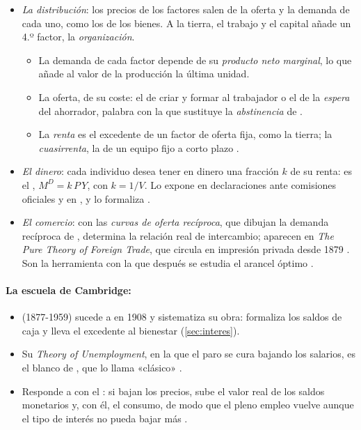 \documentclass[11pt]{article}
\begin{document}
\begin{itemize}
\item \emph{La distribución}: los precios de los factores salen de la oferta y la demanda de cada uno, como los de los bienes. A la tierra, el trabajo y el capital añade un 4.º factor, la \emph{organización}.
  \begin{itemize}
  \item La demanda de cada factor depende de su \emph{producto neto marginal}, lo que añade al valor de la producción la última unidad.
  \item La oferta, de su coste: el de criar y formar al trabajador o el de la \emph{espera} del ahorrador, palabra con la que sustituye la \emph{abstinencia} de .
  \item La \emph{renta} es el excedente de un factor de oferta fija, como la tierra; la \emph{cuasirrenta}, la de un equipo fijo a corto plazo .
  \end{itemize}
\item \emph{El dinero}: cada individuo desea tener en dinero una fracción $k$ de su renta: es el , $M^D=k\,P\,Y$, con $k=1/V$. Lo expone  en declaraciones ante comisiones oficiales y en \textcite{Marshall1923}, y lo formaliza \textcite{Pigou1917Value} .
\item \emph{El comercio}: con las \emph{curvas de oferta recíproca}, que dibujan la demanda recíproca de , determina la relación real de intercambio; aparecen en \emph{The Pure Theory of Foreign Trade}, que circula en impresión privada desde 1879\nocite{Marshall1879Pure} . Son la herramienta con la que después se estudia el arancel óptimo .
\end{itemize}

\paragraph{La escuela de Cambridge: }

\begin{itemize}
\item {} (1877-1959) sucede a  en 1908\nocite{HET2026Pigou} y sistematiza su obra: formaliza los saldos de caja\nocite{Pigou1917Value} y lleva el excedente al bienestar (\ref{sec:interes}).
\item Su \emph{Theory of Unemployment}\nocite{Pigou1933Theory}, en la que el paro se cura bajando los salarios, es el blanco de , que lo llama «clásico» .
\item Responde a  con el : si bajan los precios, sube el valor real de los saldos monetarios y, con él, el consumo, de modo que el pleno empleo vuelve aunque el tipo de interés no pueda bajar más\nocite{Pigou1943Classical} .
\end{itemize}
\end{document}
